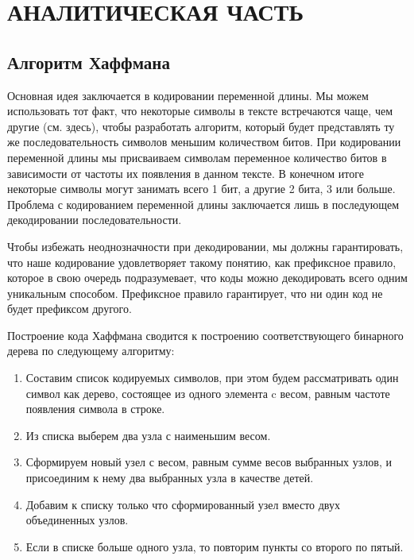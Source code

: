 \chapter{АНАЛИТИЧЕСКАЯ ЧАСТЬ}


\section{Алгоритм Хаффмана}\label{data}

Основная идея заключается в кодировании переменной длины. Мы можем использовать тот факт, что некоторые символы в тексте встречаются чаще, чем другие (см. здесь), чтобы разработать алгоритм, который будет представлять ту же последовательность символов меньшим количеством битов. При кодировании переменной длины мы присваиваем символам переменное количество битов в зависимости от частоты их появления в данном тексте. В конечном итоге некоторые символы могут занимать всего 1 бит, а другие 2 бита, 3 или больше. Проблема с кодированием переменной длины заключается лишь в последующем декодировании последовательности.

Чтобы избежать неоднозначности при декодировании, мы должны гарантировать, что наше кодирование удовлетворяет такому понятию, как префиксное правило, которое в свою очередь подразумевает, что коды можно декодировать всего одним уникальным способом. Префиксное правило гарантирует, что ни один код не будет префиксом другого.

Построение кода Хаффмана сводится к построению соответствующего бинарного дерева по следующему алгоритму:

\begin{enumerate}
\item Составим список кодируемых символов, при этом будем рассматривать один символ как дерево, состоящее из одного элемента c весом, равным частоте появления символа в строке.
\item Из списка выберем два узла с наименьшим весом.
\item Сформируем новый узел с весом, равным сумме весов выбранных узлов, и присоединим к нему два выбранных узла в качестве детей.
\item Добавим к списку только что сформированный узел вместо двух объединенных узлов.
\item Если в списке больше одного узла, то повторим пункты со второго по пятый.
\end{enumerate}